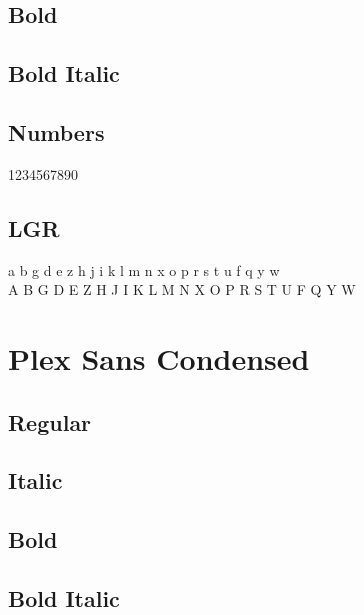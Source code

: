 \documentclass{article}
\begin{document}
\subsection*{Bold}

\textbf{\lipsum[3]}



\subsection*{Bold Italic}

\textbf{\textit{\lipsum[4]}}

\subsection*{Numbers}

1234567890


\subsection*{LGR}

{\plexsanslgr\noindent
 a b g d e z h j i k l m n x o p r s t u f q y w\\
 A B G D E Z H J I K L M N X O P R S T U F Q Y W\\
}


\clearpage
\section*{Plex Sans Condensed}

\plexsanscondensed


\subsection*{Regular}
\lipsum[1]

\subsection*{Italic}
\textit{\lipsum[2]}

\subsection*{Bold}

\textbf{\lipsum[3]}



\subsection*{Bold Italic}
\end{document}
